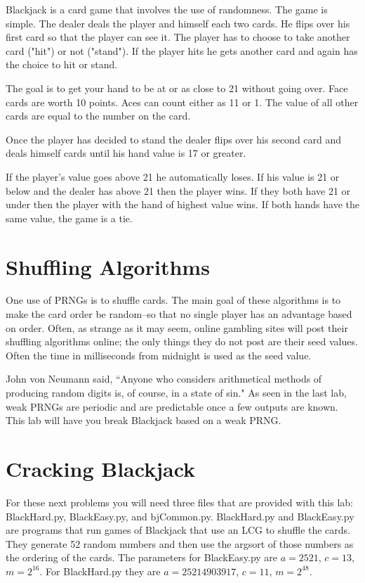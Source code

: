 Blackjack is a card game that involves the use of randomness.
The game is simple.
The dealer deals the player and himself each two cards.
He flips over his first card so that the player can see it.
The player has to choose to take another card ("hit") or not ("stand").
If the player hits he gets another card and again has the choice to hit or stand.

The goal is to get your hand to be at or as close to 21 without going over.
Face cards are worth 10 points.
Aces can count either as 11 or 1.
The value of all other cards are equal to the number on the card.

Once the player has decided to stand the dealer flips over his second card and deals himself cards until his hand value is 17 or greater. 

If the player's value goes above 21 he automatically loses.
If his value is 21 or below and the dealer has above 21 then the player wins.
If they both have 21 or under then the player with the hand of highest value wins.
If both hands have the same value, the game is a tie.

\section*{Shuffling Algorithms}
One use of PRNGs is to shuffle cards.
The main goal of these algorithms is to make the card order be random--so that no single player has an advantage based on order.
Often, as strange as it may seem, online gambling sites will post their shuffling algorithms online; the only things they do not post are their seed values.
Often the time in milliseconds from midnight is used as the seed value.

John von Neumann said, ``Anyone who considers arithmetical methods of producing random digits is, of course, in a state of sin."
As seen in the last lab, weak PRNGs are periodic and are predictable once a few outputs are known.
This lab will have you break Blackjack based on a weak PRNG.

\section*{Cracking Blackjack}
For these next problems you will need three files that are provided with this lab: BlackHard.py, BlackEasy.py, and bjCommon.py.
BlackHard.py and BlackEasy.py are programs that run games of Blackjack that use an LCG to shuffle the cards.
They generate 52 random numbers and then use the argsort of those numbers as the ordering of the cards.
The parameters for BlackEasy.py are $a=2521$, $c=13$, $m=2^{16}$.
For BlackHard.py they are $a=25214903917$, $c=11$, $m=2^{48}$.

